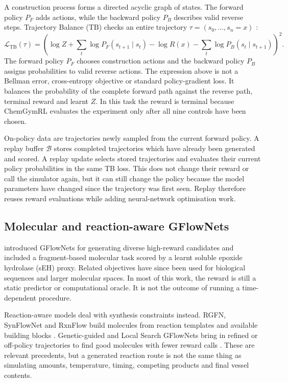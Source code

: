 \documentclass{article}
\begin{document}
A construction process forms a directed acyclic graph of states. The forward policy $P_F$ adds actions, while the backward policy $P_B$ describes valid reverse steps. Trajectory Balance (TB) checks an entire trajectory $\tau=(s_0,\ldots,s_n=x)$ \citep{malkin2022trajectory}:
\begin{equation}
\mathcal{L}_{\mathrm{TB}}(\tau)=\left(
\log Z+\sum_t\log P_F(s_{t+1}\mid s_t)
-\log R(x)-\sum_t\log P_B(s_t\mid s_{t+1})
\right)^2.
\end{equation}
The forward policy $P_F$ chooses construction actions and the backward policy $P_B$ assigns probabilities to valid reverse actions. The expression above is not a Bellman error, cross-entropy objective or standard policy-gradient loss. It balances the probability of the complete forward path against the reverse path, terminal reward and learnt $Z$. In this task the reward is terminal because ChemGymRL evaluates the experiment only after all nine controls have been chosen.

On-policy data are trajectories newly sampled from the current forward policy. A replay buffer $\mathcal{B}$ stores completed trajectories which have already been generated and scored. A replay update selects stored trajectories and evaluates their current policy probabilities in the same TB loss. This does not change their reward or call the simulator again, but it can still change the policy because the model parameters have changed since the trajectory was first seen. Replay therefore reuses reward evaluations while adding neural-network optimisation work.

\subsection{Molecular and reaction-aware GFlowNets}

\citet{bengio2021flow} introduced GFlowNets for generating diverse high-reward candidates and included a fragment-based molecular task scored by a learnt soluble epoxide hydrolase (sEH) proxy. Related objectives have since been used for biological sequences \citep{jain2022biological} and larger molecular spaces. In most of this work, the reward is still a static predictor or computational oracle. It is not the outcome of running a time-dependent procedure.

Reaction-aware models deal with synthesis constraints instead. RGFN, SynFlowNet and RxnFlow build molecules from reaction templates and available building blocks \citep{koziarski2024rgfn,cretu2025synflownet,seo2025rxnflow}. Genetic-guided and Local Search GFlowNets bring in refined or off-policy trajectories to find good molecules with fewer reward calls \citep{kim2024genetic,kim2024local}. These are relevant precedents, but a generated reaction route is not the same thing as simulating amounts, temperature, timing, competing products and final vessel contents.
\end{document}
